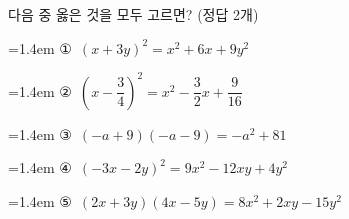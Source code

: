 다음 중 옳은 것을 모두 고르면? (정답 2개)
\par\medskip\par\noindent\hangindent=1.4em {\small ①}\ $(x+3y)^2=x^2+6x+9y^2$\par\noindent\hangindent=1.4em {\small ②}\ $\left(x-\dfrac{3}{4}\right)^2=x^2-\dfrac{3}{2}x+\dfrac{9}{16}$\par\noindent\hangindent=1.4em {\small ③}\ $(-a+9)(-a-9)=-a^2+81$\par\noindent\hangindent=1.4em {\small ④}\ $(-3x-2y)^2=9x^2-12xy+4y^2$\par\noindent\hangindent=1.4em {\small ⑤}\ $(2x+3y)(4x-5y)=8x^2+2xy-15y^2$\par\medskip
